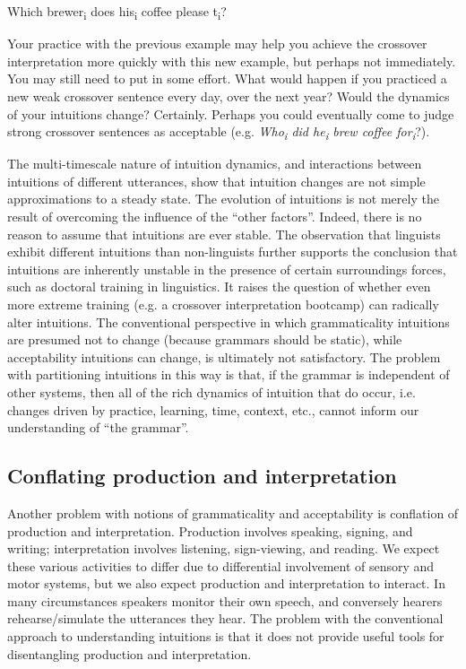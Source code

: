 \ea
Which brewer\textsubscript{i} does his\textsubscript{i} coffee please t\textsubscript{i}?
\z

  Your practice with the previous example may help you achieve the crossover interpretation more quickly with this new example, but perhaps not immediately. You may still need to put in some effort. What would happen if you practiced a new weak crossover sentence every day, over the next year? Would the dynamics of your intuitions change? Certainly. Perhaps you could eventually come to judge strong crossover sentences as acceptable (e.g. \textit{Who\textsubscript{i} did he\textsubscript{i} brew coffee for\textsubscript{i}}?). 

  The multi-timescale nature of intuition dynamics, and interactions between intuitions of different utterances, show that intuition changes are not simple approximations to a steady state. The evolution of intuitions is not merely the result of overcoming the influence of the “other factors”. Indeed, there is no reason to assume that intuitions are ever stable. The observation that linguists exhibit different intuitions than non-linguists \citep{Spencer1973} further supports the conclusion that intuitions are inherently unstable in the presence of certain surroundings forces, such as doctoral training in linguistics. It raises the question of whether even more extreme training (e.g. a crossover interpretation bootcamp) can radically alter intuitions. The conventional perspective in which grammaticality intuitions are presumed not to change (because grammars should be static), while acceptability intuitions can change, is ultimately not satisfactory. The problem with partitioning intuitions in this way is that, if the grammar is independent of other systems, then all of the rich dynamics of intuition that do occur, i.e. changes driven by practice, learning, time, context, etc., cannot inform our understanding of “the grammar”.

\subsection{Conflating production and interpretation}

Another problem with notions of grammaticality and acceptability is conflation of production and interpretation. Production involves speaking, signing, and writing; interpretation involves listening, sign-viewing, and reading. We expect these various activities to differ due to differential involvement of sensory and motor systems, but we also expect production and interpretation to interact. In many circumstances speakers monitor their own speech, and conversely hearers rehearse/simulate the utterances they hear. The problem with the conventional approach to understanding intuitions is that it does not provide useful tools for disentangling production and interpretation.

